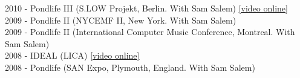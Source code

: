 2010 - Pondlife III (S.LOW Projekt, Berlin. With Sam Salem) {\href{http://vimeo.com/14878086}{[video online]}}\\
2009 - Pondlife II (NYCEMF II, New York. With Sam Salem)\\
2009 - Pondlife II (International Computer Music Conference, Montreal. With Sam Salem)\\
2008 - IDEAL (LICA) {\href{http://vimeo.com/5741743}{[video online]}}\\
2008 - Pondlife (SAN Expo, Plymouth, England. With Sam Salem)
